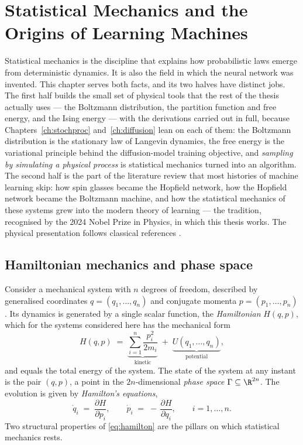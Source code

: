 \chapter{Statistical Mechanics and the Origins of Learning Machines}
\label{ch:statmech}

Statistical mechanics is the discipline that explains how probabilistic laws
emerge from deterministic dynamics. It is also the field in which the neural
network was invented. This chapter serves both facts, and its two halves have
distinct jobs. The first half builds the small set of physical tools that the
rest of the thesis actually uses --- the Boltzmann distribution, the
partition function and free energy, and the Ising energy --- with the
derivations carried out in full, because Chapters~\ref{ch:stochproc}
and~\ref{ch:diffusion} lean on each of them: the Boltzmann distribution is
the stationary law of Langevin dynamics, the free energy is the variational
principle behind the diffusion-model training objective, and \emph{sampling
by simulating a physical process} is statistical mechanics turned into an
algorithm. The second half is the part of the literature review that most
histories of machine learning skip: how spin glasses became the Hopfield
network, how the Hopfield network became the Boltzmann machine, and how the
statistical mechanics of these systems grew into the modern theory of
learning --- the tradition, recognised by the 2024 Nobel Prize in Physics,
in which this thesis works. The physical presentation follows classical
references \citep{goldstein2002classical, landau1980statistical}.

\section{Hamiltonian mechanics and phase space}\label{sec:hamiltonian}

Consider a mechanical system with $n$ degrees of freedom, described by
generalised coordinates $q = (q_1, \dots, q_n)$ and conjugate momenta
$p = (p_1, \dots, p_n)$. Its dynamics is generated by a single scalar
function, the \emph{Hamiltonian} $H(q, p)$, which for the systems considered
here has the mechanical form
\begin{equation}
  H(q, p) \;=\; \underbrace{\sum_{i=1}^{n} \frac{p_i^2}{2m_i}}_{\text{kinetic}}
  \;+\; \underbrace{U(q_1, \dots, q_n)}_{\text{potential}},
  \label{eq:hamiltonian}
\end{equation}
and equals the total energy of the system. The state of the system at any
instant is the pair $(q, p)$, a point in the $2n$-dimensional \emph{phase
space} $\Gamma \subseteq \R^{2n}$. The evolution is given by
\emph{Hamilton's equations},
\begin{equation}
  \dot{q}_i \;=\; \frac{\partial H}{\partial p_i},
  \qquad
  \dot{p}_i \;=\; -\,\frac{\partial H}{\partial q_i},
  \qquad i = 1, \dots, n.
  \label{eq:hamilton}
\end{equation}
Two structural properties of \eqref{eq:hamilton} are the pillars on which
statistical mechanics rests.

